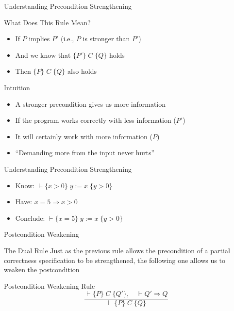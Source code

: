 \begin{frame}{Understanding Precondition Strengthening}
    \begin{block}{What Does This Rule Mean?}
        \begin{itemize}
            \item If $P$ implies $P'$ (i.e., $P$ is stronger than $P'$)
            \item And we know that $\{P'\} \; C \; \{Q\}$ holds
            \item Then $\{P\} \; C \; \{Q\}$ also holds
        \end{itemize}
    \end{block}

    \begin{block}{Intuition}
        \begin{itemize}
            \item A stronger precondition gives us more information
            \item If the program works correctly with less information ($P'$)
            \item It will certainly work with more information ($P$)
            \item ``Demanding more from the input never hurts''
        \end{itemize}
    \end{block}


\end{frame}
\begin{frame}{Understanding Precondition Strengthening}
    \begin{example}
        \begin{itemize}
            \item Know: $\vdash \{x > 0\} \; y := x \; \{y > 0\}$
            \item Have: $x = 5 \Rightarrow x > 0$
            \item Conclude: $\vdash \{x = 5\} \; y := x \; \{y > 0\}$
        \end{itemize}
    \end{example}
\end{frame}

\begin{frame}{Postcondition Weakening}
    \begin{block}{The Dual Rule}
        Just as the previous rule allows the precondition of a partial correctness specification to be strengthened, the following one allows us to weaken the postcondition
    \end{block}

    \begin{block}{Postcondition Weakening Rule}
        \[ \frac{\vdash \{P\} \; C \; \{Q'\}, \quad \vdash Q' \Rightarrow Q}{\vdash \{P\} \; C \; \{Q\}} \]
    \end{block}
\end{frame}

